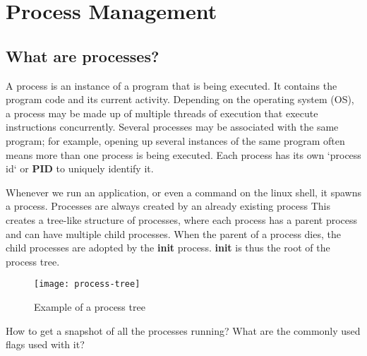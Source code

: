 \setchapterpreamble[u]{\margintoc}
\chapter{Process Management}

\section{What are processes?}

\begin{definition}[Process]
  A process is an instance of a program that is being executed.
  It contains the program code and its current activity.
  Depending on the operating system (OS), a process may be made up of
  multiple threads of execution that execute instructions concurrently.
  Several processes may be associated with the same program; for example,
  opening up several instances of the same program often means more than
  one process is being executed.
  Each process has its own `process id` or \textbf{PID} to uniquely identify it.
\end{definition}

Whenever we run an application, or even a command on the linux shell, it spawns a process. Processes are always created by an already
existing process
This creates a tree-like structure of processes, where each process has a parent process and can have multiple child processes.
When the parent of a process dies, the child processes are adopted by the \textbf{init} process.
\textbf{init} is thus the root of the process tree.

\begin{figure}[h!]
  \texttt{[image: process-tree]}
  \caption{Example of a process tree}
\end{figure}

\begin{qs}
  How to get a snapshot of all the processes running?
  What are the commonly used flags used with it?
\end{qs}

